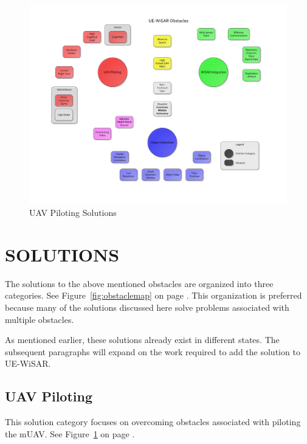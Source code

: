 \begin{figure}[htp]
	\vspace{-80pt}
	\hspace{-90pt}
	\includegraphics[keepaspectratio=true, width=\paperheight,
	height=\paperheight, page=3, angle=90, scale=0.95,
	trim=10 0 10 0]{obstacle_solution_map.pdf}
	\caption{UAV Piloting Solutions}
	\label{fig:uavpilotingmap}
\end{figure}

\section{SOLUTIONS}
The solutions to the above mentioned obstacles are organized into three categories.
See Figure~\ref{fig:obstaclemap} on page
\pageref{fig:obstaclemap}.  This organization is preferred because many of
the solutions discussed here solve problems associated with multiple obstacles. 

As mentioned earlier, these solutions already exist in different states.  The
subsequent paragraphs will expand on the work required to add the solution to
UE-WiSAR.

\subsection{UAV Piloting}
This solution category focuses on overcoming obstacles
associated with piloting the mUAV.  See Figure~\ref{fig:uavpilotingmap} on page
\pageref{fig:uavpilotingmap}.



